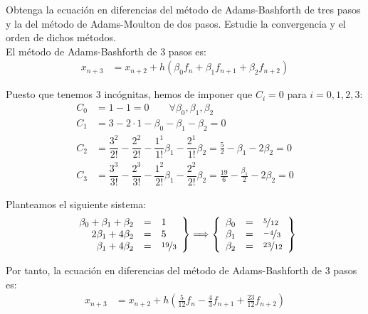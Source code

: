 \begin{ejercicio}\label{ej:3.1.14}
    Obtenga la ecuación en diferencias del método de Adams-Bashforth de tres pasos y la del método de Adams-Moulton de dos pasos. Estudie la convergencia y el orden de dichos métodos.\\

    El método de Adams-Bashforth de 3 pasos es:
    \begin{align*}
        x_{n+3} &= x_{n+2} + h\left(\beta_0 f_n + \beta_1 f_{n+1} + \beta_2 f_{n+2}\right)
    \end{align*}

    Puesto que tenemos $3$ incógnitas, hemos de imponer que $C_i=0$ para $i=0,1,2,3$:
    \begin{align*}
        C_0 &= 1 -1 = 0\qquad \forall \beta_0, \beta_1, \beta_2\\
        C_1 &= 3-2\cdot 1 - \beta_0 - \beta_1 - \beta_2 = 0\\
        C_2 &= \dfrac{3^2}{2!} - \dfrac{2^2}{2!} - \dfrac{1^1}{1!}\beta_1 - \dfrac{2^1}{1!}\beta_2 = \frac{5}{2} - \beta_1 - 2\beta_2 = 0\\
        C_3 &= \dfrac{3^3}{3!} - \dfrac{2^3}{3!} - \dfrac{1^2}{2!}\beta_1 - \dfrac{2^2}{2!}\beta_2 = \frac{19}{6} - \frac{\beta_1}{2} - 2\beta_2 = 0
    \end{align*}

    Planteamos el siguiente sistema:
    \begin{equation*}
        \left.
            \begin{array}{rcl}
                \beta_0 + \beta_1 + \beta_2 &=& 1\\
                2\beta_1 + 4\beta_2 &=& 5\\
                \beta_1 + 4\beta_2 &=& \nicefrac{19}{3}
            \end{array}
        \right\}
        \Longrightarrow
        \left\{
            \begin{array}{rcl}
                \beta_0 &=& \nicefrac{5}{12}\\
                \beta_1 &=& \nicefrac{-4}{3}\\
                \beta_2 &=& \nicefrac{23}{12}
            \end{array}
        \right\}
    \end{equation*}

    Por tanto, la ecuación en diferencias del método de Adams-Bashforth de 3 pasos es:
    \begin{align*}
        x_{n+3} &= x_{n+2} + h\left(\frac{5}{12} f_n - \frac{4}{3} f_{n+1} + \frac{23}{12} f_{n+2}\right)
    \end{align*}~\\


\end{ejercicio}
